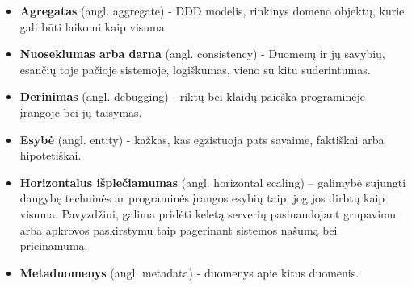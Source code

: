 \begin{itemize}

  \item \textbf{Agregatas} (angl. aggregate) - DDD modelis, rinkinys domeno objektų, kurie gali būti laikomi kaip visuma.

  \item \textbf{Nuoseklumas arba darna} (angl. consistency) - Duomenų ir jų savybių, esančių toje pačioje sistemoje, logiškumas, vieno su kitu suderintumas.

  \item \textbf{Derinimas} (angl. debugging) - riktų bei klaidų paieška programinėje įrangoje bei jų taisymas.

  \item \textbf{Esybė} (angl. entity) - kažkas, kas egzistuoja pats savaime, faktiškai arba hipotetiškai.

  \item \textbf{Horizontalus išplečiamumas} (angl. horizontal scaling) – galimybė sujungti daugybę techninės ar programinės įrangos esybių taip, jog jos dirbtų kaip visuma. Pavyzdžiui, galima pridėti keletą serverių pasinaudojant grupavimu arba apkrovos paskirstymu taip pagerinant sistemos našumą bei prieinamumą.

  \item \textbf{Metaduomenys} (angl. metadata) - duomenys apie kitus duomenis.

\end{itemize}
